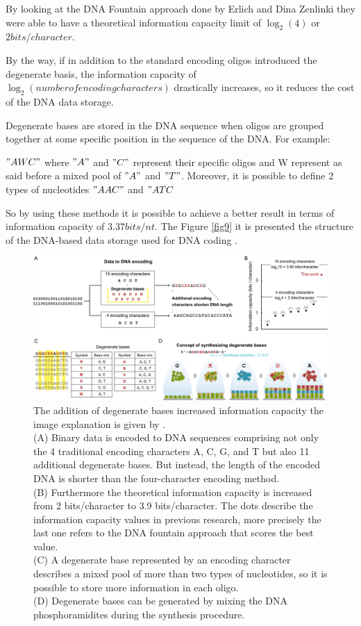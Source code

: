 \documentclass[10pt,twocolumn,twoside]{gsajnl}
\theoremstyle{definition}
\begin{document}
By looking at the DNA Fountain approach done by Erlich and Dina Zenlinki they were able to have a theoretical information capacity limit of $\log_{2}(4)$ or $2bits/character$.

By the way, if in addition to the standard encoding oligos introduced the degenerate basis, the information capacity of $\log_{2}(number of encoding characters)$ drastically increases, so it reduces the cost of the DNA data storage.

Degenerate bases are stored in the DNA sequence when oligos are grouped together at some specific position in the sequence of the DNA. For example:

$"AWC"$ where $"A"$ and $"C"$ represent their specific oligos and W represent as said before a mixed pool of $"A"$ and $"T"$. Moreover, it is possible to define 2 types of nucleotides $"AAC"$ and $"ATC$ 

So by using these methods it is possible to achieve a better result in terms of information capacity of $3.37 bits/nt$.
The Figure \ref{fig9} it is presented the structure of the DNA-based data storage used for DNA coding \cite{choi2019high}.

\begin{figure}[ht]
\centering
\includegraphics[width=\linewidth]{image degenerate basis.jpg}
\caption{The addition of degenerate bases increased information capacity the image explanation is given by \cite{choi2019high}.
\\(A) Binary data is encoded to DNA sequences comprising not only the 4 traditional encoding characters A, C, G, and T but also 11 additional degenerate bases. But instead, the length of the encoded DNA is shorter than the four-character encoding method.
\\(B) Furthermore the theoretical information capacity is increased from 2 bits/character to 3.9 bits/character. The dots describe the information capacity values in previous research, more precisely the last one refers to the DNA fountain approach that scores the best value.
\\(C) A degenerate base represented by an encoding character describes a mixed pool of more than two types of nucleotides, so it is possible to store more information in each oligo.
\\(D) Degenerate bases can be generated by mixing the DNA phosphoramidites during the synthesis procedure.}
\label{fig8}
\end{figure}
\end{document}
